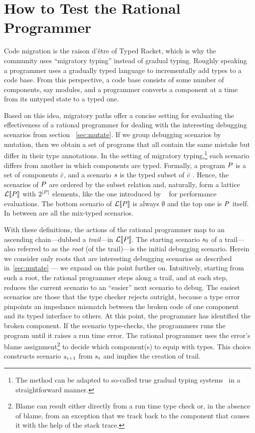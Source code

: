 \section{How to Test the Rational Programmer} 
\label{sec:rational}

Code migration is the raison d'\^etre of Typed Racket, which is why the community
uses ``migratory typing'' instead of gradual typing. Roughly speaking a
programmer uses a gradually typed language to incrementally add types to a code
base. From this perspective, a code base consists of some number of components,
say modules, and a programmer converts a component at a time from its untyped
state to a typed one. 

Based on this idea, migratory paths offer a concise setting for
evaluating the effectiveness of a rational programmer for dealing with the
interesting debugging scenarios  from section ~\ref{sec:mutate}.
If we group debugging scenarios by mutation, then we obtain a set 
of programs that all contain the same mistake but differ in their type
annotations.  In the setting of migratory typing,\footnote{The method can be adapted to
so-called true gradual typing systems~\cite{svcb-snapl-2015} in a
straightforward manner.} each scenario differs from another in which
components are typed. Formally, a program $P$ is a set of
components $\bar{c}$, and a scenario $s$ is the typed subset of
$\bar{c}$ . Hence, the scenarios of $P$ are ordered by the
subset relation and, naturally,  form a lattice $\mathcal{L}\llbracket P\rrbracket$ with
$2^{\mid P \mid}$ elements, like
the one introduced by ~\citet{tfgnvf-popl-2016} for performance
evaluations. The bottom scenario of
$\mathcal{L}\llbracket P\rrbracket$ is always $\emptyset$ and the top one is $P$
itself. In between are all the mix-typed scenarios.


With these definitions, the actions of the rational programmer map to an
ascending chain---dubbed a \emph{trail}---in $\mathcal{L}\llbracket P\rrbracket$.  The
starting scenario $s_0$ of a trail---also referred to as the
\emph{root} (of the trail)---is the initial debugging scenario.  Herein we
consider only roots that are interesting debugging scenarios as described
in~\ref{sec:mutate} --- we expand on this point further on.  Intuitively,
starting from such a root, the rational programmer  steps along a trail,
and at each step, reduces the current scenario to an ``easier'' next
scenario to debug.  The easiest scenarios are those that the type checker
rejects outright, because a type error pinpoints an impedance mismatch
between the broken code of one component and its typed interface to
others. At this point, the programmer has identified the broken component.
If the scenario type-checks, the programmers runs the program until it
raises a run time error.  The rational programmer uses the error's blame
assignment\footnote{Blame can result either directly from a run time type
check or, in the absence of blame, from an exception that we track back to
the component that causes it with the help of the stack trace.} to decide
which component(s) to equip with types. This choice constructs scenario
$s_{i+1}$ from $s_{i}$ and implies the creation of trail.  

